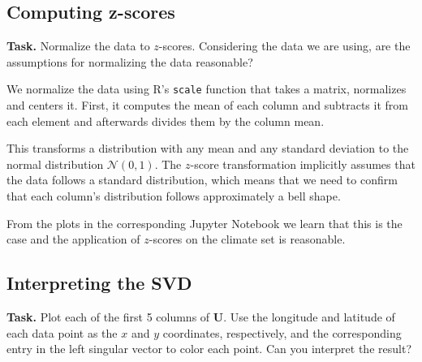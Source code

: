 \documentclass{support/acm_proc_article-sp}
\begin{document}
    \subsection{Computing z-scores}
    \label{subsec:z-scores}

    \textbf{Task.} Normalize the data to $z$-scores.
    Considering the data we are using, are the assumptions for normalizing the data reasonable?

    We normalize the data using R's \lstinline{scale} function that takes a matrix, normalizes and centers it.
    First, it computes the mean of each column and subtracts it from each element and afterwards divides them by the
    column mean.

    This transforms a distribution with any mean and any standard deviation to the normal distribution
    $\mathcal{N}(0, 1)$.
    The $z$-score transformation implicitly assumes that the data follows a standard distribution, which means that we need
    to confirm that each column's distribution follows approximately a bell shape.

    From the plots in the corresponding Jupyter Notebook we learn that this is the case and the application of
    $z$-scores on the climate set is reasonable.



    \subsection{Interpreting the SVD}
    \label{subsec:interpret-svd}

    \textbf{Task.} Plot each of the first 5 columns of $\mathbf{U}$.
    Use the longitude and latitude of each data point as the $x$ and $y$ coordinates, respectively, and the
    corresponding entry in the left singular vector to color each point.
    Can you interpret the result?
\end{document}
